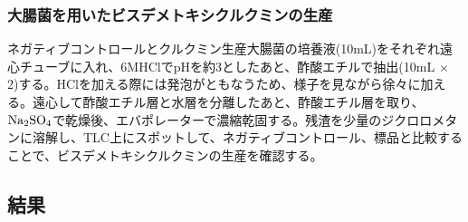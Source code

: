\documentclass[a4paper,papersize,dvipdfmx]{jsarticle}
\begin{document}
\subsubsection*{大腸菌を用いたビスデメトキシクルクミンの生産}
ネガティブコントロールとクルクミン生産大腸菌の培養液(10mL)をそれぞれ遠心チューブに入れ、6MHClでpHを約3としたあと、酢酸エチルで抽出(10mL $\times$ 2)する。HClを加える際には発泡がともなうため、様子を見ながら徐々に加える。遠心して酢酸エチル層と水層を分離したあと、酢酸エチル層を取り、$\rm Na_2SO_4$で乾燥後、エバポレーターで濃縮乾固する。残渣を少量のジクロロメタンに溶解し、TLC上にスポットして、ネガティブコントロール、標品と比較することで、ビスデメトキシクルクミンの生産を確認する。

\subsection*{結果}
\end{document}
